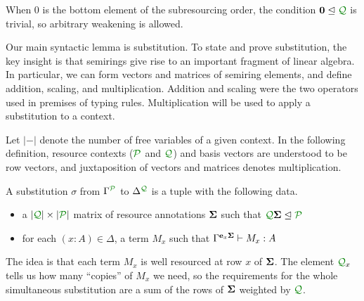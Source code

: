 When $0$ is the bottom element of the subresourcing order, the condition $\vct 0
\subres \resctx Q$ is trivial, so arbitrary weakening is allowed.

Our main syntactic lemma is substitution.
To state and prove substitution, the key insight is that semirings give rise to
an important fragment of linear algebra.
In particular, we can form vectors and matrices of semiring elements, and define
addition, scaling, and multiplication.
Addition and scaling were the two operators used in premises of typing rules.
Multiplication will be used to apply a substitution to a context.


Let $|-|$ denote the number of free variables of a given context.
In the following definition, resource contexts ($\resctx P$ and $\resctx Q$) and
basis vectors are understood to be row vectors, and juxtaposition of vectors and
matrices denotes multiplication.

\begin{definition}
  A substitution $\sigma$ from $\Gamma^{\resctx P}$ to
  $\Delta^{\resctx Q}$ is a tuple with the following data.

  \begin{itemize}
  \item a $|\resctx Q| \times |\resctx P|$ matrix of resource annotations $\mathbf{\Sigma}$ such that $\resctx Q \mat \Sigma \subres \resctx P$
  \item for each $(x:A) \in \Delta$, a term $M_x$ such that
    $\Gamma^{\mathbf{e}_x \mathbf{\Sigma}} \vdash M_x : A$
  \end{itemize}
\end{definition}

The idea is that each term $M_x$ is well resourced at row $x$ of $\mathbf{\Sigma}$.
The element $\resctx Q_x$ tells us how many ``copies'' of $M_x$ we need, so the
requirements for the whole simultaneous substitution are a sum of the rows of
$\mathbf{\Sigma}$ weighted by $\resctx Q$.

